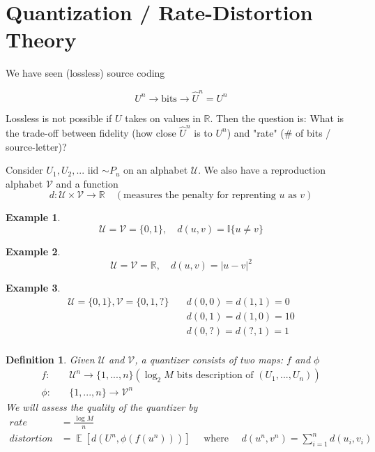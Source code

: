 \documentclass[twoside]{article}
\newtheorem{definition}{Definition}[section]
\theoremstyle{definition} %
\newtheorem{example}{Example}
\def\V{\mathcal{V}}
\def\U{\mathcal{U}}
\def\R{\mathbb{R}}
\def\I{\mathbb{I}}
\DeclareMathOperator{\E}{\mathbb{E}}%
\begin{document}


\cleardoublepage
\section{Quantization / Rate-Distortion Theory}

We have seen (lossless) source coding

\[
  U^n \rightarrow \text{bits} \rightarrow \hat{U}^n = U^n
\]

Lossless is not possible if $U$ takes on values in $\R$. Then the question is: What is the trade-off between fidelity (how close $\hat{U}^n$ is to $U^n$) and "rate" ($\#$ of bits / source-letter)?

Consider $U_1, U_2, ...$ iid $\sim P_u$ on an alphabet $\U$. We also have a reproduction alphabet $\V$ and a function
\[
  d: \U \times \V \rightarrow \R \quad (\text{measures the penalty for reprenting } u \text{ as } v)
\]

\begin{example}
  \[
    \U = \V = \{ 0, 1 \}, \quad d(u,v) = \I\{u \neq v\}
  \]
\end{example}

\begin{example}
  \[
    \U = \V = \R, \quad d(u,v) = |u - v|^2
  \]
\end{example}

\begin{example}
  \begin{align*}
    \U = \{0, 1\}, \V = \{ 0, 1, ? \} \quad & d(0,0) = d(1,1) = 0 \\
                                            & d(0,1) = d(1,0) = 10 \\
                                            & d(0,?) = d(?,1) = 1 \\
  \end{align*}
\end{example}

\begin{definition}
  Given $\U$ and $\V$, a quantizer consists of two maps: $f$ and $\phi$
  \begin{align*}
    f: & \quad \U^n \rightarrow \{ 1, ..., n \} (\log_2 M \text{ bits description of } (U_1, ..., U_n)) \\
    \phi: & \quad \{1, ..., n \} \rightarrow \V^n
  \end{align*}
  We will assess the quality of the quantizer by
  \begin{align*}
    rate &= \frac{\log M}{n} \\
    distortion &= \E[d(U^n, \phi(f(u^n)))] \quad \text{ where } \quad d(u^n, v^n) = \sum_{i = 1}^n d(u_i, v_i)
  \end{align*}
\end{definition}
\end{document}
